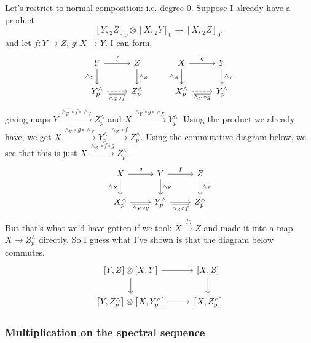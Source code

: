 \documentclass{MetricNotes2023}
\begin{document}
\begin{itemize}
\begin{enumerate}
Let's restrict to normal composition: i.e. degree 0. Suppose I already have a product 
\[[Y, \text{}_2Z]_0\otimes [X, \text{}_2Y]_0\to [X, \text{}_2Z]_0,\]
and let \(f : Y \to Z\), \(g : X \to Y\). I can form,
\[\begin{tikzcd}
Y \arrow[r, "f"] \arrow[d, swap, "\wedge_Y"]  & Z \arrow[d, "\wedge_Z"]  \\
Y^\wedge_p \arrow[r, swap, "\overline{\wedge_Z \circ f}", dashrightarrow]  & Z^\wedge_p
\end{tikzcd}\qquad \begin{tikzcd}
X \arrow[r, "g"] \arrow[d, swap, "\wedge_X"]  & Y \arrow[d, "\wedge_Y"]  \\
X^\wedge_p \arrow[r, swap, "\overline{\wedge_Y \circ g}", dashrightarrow]  & Y^\wedge_p
\end{tikzcd}\]
giving maps \(Y \xrightarrow{\overline{\wedge_Z \circ f}\circ \wedge_Y} Z^\wedge_p\) and \(X \xrightarrow{\overline{\wedge_Y \circ g}\circ \wedge_X} Y^\wedge_p\). Using the product we already have, we get \(X \xrightarrow{\overline{\wedge_Y \circ g}\circ \wedge_X} Y^\wedge_p \xrightarrow{\overline{\wedge_Z \circ f}} Z^\wedge_p\). Using the commutative diagram below, we see that this is just \(X \xrightarrow{\wedge_Z\circ f\circ g}Z^\wedge_p\). 
\[\begin{tikzcd}
 X \arrow[r, "g"] \arrow[d, swap, "\wedge_X"]  & Y \arrow[r, "f"] \arrow[d, "\wedge_Y"] & Z \arrow[d, "\wedge_Z"] \\ 
 X^\wedge_p \arrow[r, swap, "\overline{\wedge_Y \circ g}"]  & Y^\wedge_p \arrow[r, "\overline{\wedge_Z \circ f}"'] & Z^\wedge_p 
 \end{tikzcd}\] 
But that's what we'd have gotten if we took \(X \xrightarrow{fg}Z\) and made it into a map \(X \to Z^\wedge_p\) directly. So I guess what I've shown is that the diagram below commutes.
\[\begin{tikzcd}
\left[Y, Z\right]\otimes \left[X, Y\right] \arrow[r, ""] \arrow[d, swap, ""]  & \left[X,Z\right] \arrow[d, ""]  \\
\left[Y, Z^\wedge_p\right] \otimes \left[X, Y^\wedge_p\right] \arrow[r, swap, ""]  & \left[X, Z^\wedge_p\right]
\end{tikzcd}\]
\end{enumerate}
\end{itemize}

\subsubsection{Multiplication on the spectral sequence}
\end{document}
